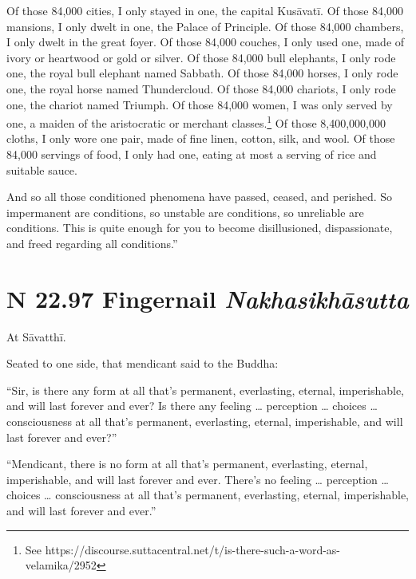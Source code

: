 \documentclass[12pt,openany]{book}%
\newcommand*{\suttatitleacronym}[1]{\smaller[2]{#1}\vspace*{.3em}}
\newcommand*{\suttatitletranslation}[1]{\linebreak{#1}}
\newcommand*{\suttatitleroot}[1]{\linebreak\smaller[2]\itshape{#1}}
\newcommand*{\tocacronym}[1]{\hspace*{-3.3em}{#1}\quad}
\newcommand*{\toctranslation}[1]{#1}
\newcommand*{\tocroot}[1]{(\textit{#1})}
\begin{document}
Of those 84,000 cities, I only stayed in one, the capital \textsanskrit{Kusāvatī}. Of those 84,000 mansions, I only dwelt in one, the Palace of Principle. Of those 84,000 chambers, I only dwelt in the great foyer. Of those 84,000 couches, I only used one, made of ivory or heartwood or gold or silver. Of those 84,000 bull elephants, I only rode one, the royal bull elephant named Sabbath. Of those 84,000 horses, I only rode one, the royal horse named Thundercloud. Of those 84,000 chariots, I only rode one, the chariot named Triumph. Of those 84,000 women, I was only served by one, a maiden of the aristocratic or merchant classes.\footnote{See https://discourse.suttacentral.net/t/is-there-such-a-word-as-velamika/2952 } Of those 8,400,000,000 cloths, I only wore one pair, made of fine linen, cotton, silk, and wool. Of those 84,000 servings of food, I only had one, eating at most a serving of rice and suitable sauce. 

And so all those conditioned phenomena have passed, ceased, and perished. So impermanent are conditions, so unstable are conditions, so unreliable are conditions. This is quite enough for you to become disillusioned, dispassionate, and freed regarding all conditions.” 

%
\section*{{\suttatitleacronym SN 22.97}{\suttatitletranslation A Fingernail }{\suttatitleroot Nakhasikhāsutta}}
\addcontentsline{toc}{section}{\tocacronym{SN 22.97} \toctranslation{A Fingernail } \tocroot{Nakhasikhāsutta}}

At \textsanskrit{Sāvatthī}. 

Seated to one side, that mendicant said to the Buddha: 

“Sir, is there any form at all that’s permanent, everlasting, eternal, imperishable, and will last forever and ever? Is there any feeling … perception … choices … consciousness at all that’s permanent, everlasting, eternal, imperishable, and will last forever and ever?” 

“Mendicant, there is no form at all that’s permanent, everlasting, eternal, imperishable, and will last forever and ever. There’s no feeling … perception … choices … consciousness at all that’s permanent, everlasting, eternal, imperishable, and will last forever and ever.” 
\end{document}

